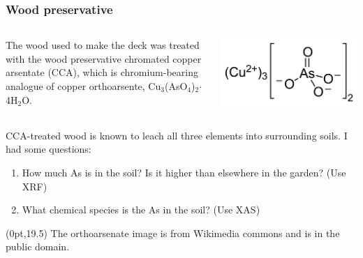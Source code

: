 \documentclass[10pt, xcolor=x11names, compress]{beamer}
\begin{document}
\begin{frame}
  \frametitle{Wood preservative}

  \begin{columns}[T]
    \begin{column}{0.6\linewidth}
      The wood used to make the deck was treated with the wood
      preservative chromated copper arsentate (CCA), which is
      chromium-bearing analogue of copper orthoarsente,
      Cu$_3$(AsO$_4$)$_2$$\cdot$4H$_2$O.
    \end{column}
    \begin{column}{0.4\linewidth}
      \includegraphics[width=\linewidth]{garden/copper_arsenate.png}      
    \end{column}
  \end{columns}

  \bigskip

  \begin{block}{}
    CCA-treated wood is known to leach all three elements into
    surrounding soils.  I had some questions:

    \bigskip

    \begin{enumerate}
    \item How much As is in the soil?  Is it higher than elsewhere
      in the garden? (Use XRF)
    \item What chemical species is the As in the soil?  (Use XAS)
    \end{enumerate}
  \end{block}
  \begin{textblock*}{0.5\linewidth}(0pt,19.5\TPVertModule)%
    \tiny%
    The orthoarsenate image is from Wikimedia commons and is in the
    public domain.
  \end{textblock*}
\end{frame}
\end{document}

